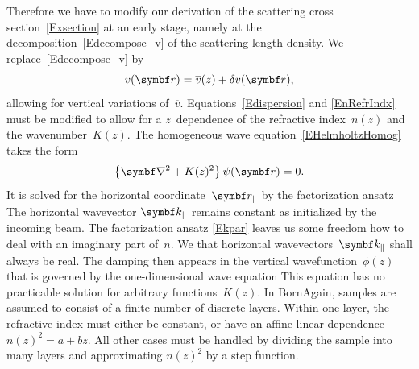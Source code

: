 Therefore we have to modify our derivation of
the scattering cross section~\cref{Exsection} at an early stage,
namely at the decomposition~\cref{Edecompose_v} of the scattering length density.
%
We replace~\cref{Edecompose_v} by
\begin{equation}\label{Edecompose_vz}
  v(\r) = \overline{v}(z) + \delta v(\r),
\end{equation}
allowing for vertical variations of~$\overline{v}$.
Equations~\cref{Edispersion} and \cref{EnRefrIndx} must be modified
to allow for a $z$~dependence of the refractive index~$n(z)$ and the wavenumber~$K(z)$.
The homogeneous wave equation~\cref{EHelmholtzHomog} takes the form
\begin{equation}\label{EHelmholtzGradedHomog}
  \left\{\Nabla^2+K(z)^2\right\}\psi(\r) = 0.
\end{equation}
It is solved for the horizontal coordinate~$\r_\parallel$
by the factorization ansatz
%
%
The horizontal wavevector $\k_\parallel$ remains constant
as initialized by the incoming beam.
The factorization ansatz \cref{Ekpar} leaves us some freedom
how to deal with an imaginary part of~$n$.
We  that horizontal wavevectors~$\k_\parallel$
shall always be real.
The damping then appears in the vertical wavefunction~$\phi(z)$
that is governed by the one-dimensional wave equation
This equation has no practicable solution for arbitrary functions~$K(z)$.
In BornAgain, samples are assumed to consist of a finite number of discrete layers.
%
%
Within one layer, the refractive index must either be constant,
or have an affine linear dependence $n(z)^2=a+bz$.
All other cases must be handled by dividing the sample into many layers
and approximating $n(z)^2$ by a step function.

%
%
%

